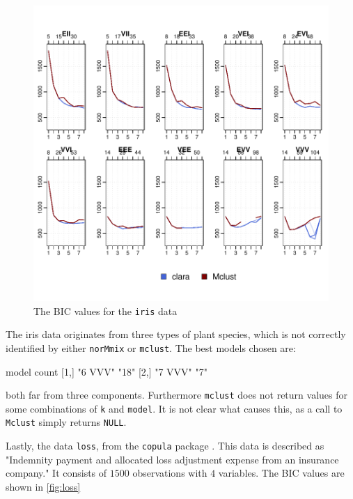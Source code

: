\begin{figure}[h!]
    \begin{Rgraph}[0.9]
\includegraphics{chapter3-figtriris}
    \caption{The BIC values for the {\tt iris} data}
    \label{fig:triris}
    \end{Rgraph}
\end{figure}

The iris data originates from three types of plant species, which is not 
correctly identified by either {\tt norMmix} or {\tt mclust}. The best models
chosen are:

\begin{Schunk}
\begin{Soutput}
     model   count
[1,] "6 VVV" "18" 
[2,] "7 VVV" "7"  
\end{Soutput}
\end{Schunk}

both far from three components. Furthermore {\tt mclust} does not return values
for some combinations of {\tt k} and {\tt model}. It is not clear what causes 
this, as a call to {\tt Mclust} simply returns {\tt NULL}.

Lastly, the data {\tt loss}, from the {\tt copula} package \cite{cop18}. This 
data is described as "Indemnity payment and allocated loss adjustment expense 
from an insurance company." It consists of $1500$ observations with $4$ 
variables. The BIC values are shown in \ref{fig:loss}

